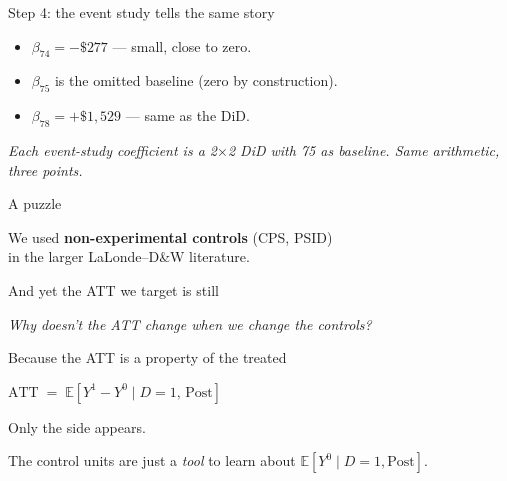\documentclass[11pt,aspectratio=169]{beamer}
\begin{document}
\begin{frame}{Step 4: the event study tells the same story}
\vspace{0.4em}
\begin{itemize}
  \item $\beta_{74} = -\$277$ \;--- small, close to zero. \;
  \item $\beta_{75}$ is the omitted baseline (zero by construction).
  \item $\beta_{78} = +\$1{,}529$ \;--- same as the DiD.
\end{itemize}
\vspace{0.6em}
\begin{center}
\small\color{warmgray}\itshape
Each event-study coefficient is a 2$\times$2 DiD with 75 as baseline. \;Same arithmetic, three points.
\end{center}
\end{frame}


\begin{frame}{A puzzle}
\vspace{1em}
\begin{center}
\large
We used \textbf{non-experimental controls} (CPS, PSID) \\[0.2em] in the larger LaLonde--D\&W literature.
\end{center}
\vspace{0.6em}
\begin{center}
\large
And yet the ATT we target is still \;
\end{center}
\vspace{0.8em}
\begin{center}
\large\itshape\color{charcoal}
Why doesn't the ATT change when we change the controls?
\end{center}
\end{frame}

\begin{frame}{Because the ATT is a property of the treated}
\vspace{1.4em}
\begin{center}
\Large
$\text{ATT} \;=\; \mathbb{E}[Y^1 - Y^0 \mid D = 1,\, \text{Post}]$
\end{center}
\vspace{1.2em}
\begin{center}
\large
Only the \; \;side appears.
\end{center}
\vspace{0.6em}
\begin{center}
The control units are just a \textit{tool} to learn about $\mathbb{E}[Y^0 \mid D{=}1, \text{Post}]$.
\end{center}
\end{frame}
\end{document}
